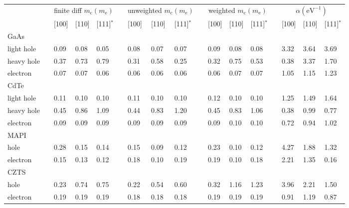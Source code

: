 \begin{landscape}
\newcommand{\ra}[1]{\renewcommand{\arraystretch}{#1}}
\begin{table}[tb]\centering
\ra{1.3}
\begin{tabular}{@{}lclllclllclllclll@{}}\toprule
& \phantom{abc}&\multicolumn{3}{c}{finite diff $m_\text{c}\left(m_{\text{e}}\right)$} & \phantom{abc}& \multicolumn{3}{c}{unweighted $m_\text{c}\left(m_{\text{e}}\right)$} &\phantom{abc} & \multicolumn{3}{c}{weighted $m_\text{c}\left(m_{\text{e}}\right)$} & \phantom{abc} & \multicolumn{3}{c}{$\alpha \left(\mathrm{eV}^{-1}\right)$}\\
\cline{3-5} \cline{7-9} \cline{11-13} \cline{15-17}
&& [100] & [110] & [111]$^*$  && [100] & [110] & [111]$^*$   && [100] & [110] & [111]$^*$   && [100] & [110] & [111]$^*$  \\ 
\midrule
GaAs\\
light hole 
&& 0.09 & 0.08 & 0.05        &&  0.08    & 0.07  & 0.07     && 0.09 & 0.08 & 0.08     && 3.32 & 3.64 & 3.69  \\
heavy hole 
&& 0.37 & 0.73 & 0.79        &&  0.31    & 0.58  & 0.25     && 0.32 & 0.75 & 0.53     && 0.38 & 3.37 & 1.70  \\
electron 
&& 0.07 & 0.07 & 0.06        &&  0.06    & 0.06  & 0.06     && 0.06 & 0.07 & 0.07     && 1.05 & 1.15 & 1.23  \\
CdTe\\
light hole 
&& 0.11 & 0.10 & 0.10        &&  0.11    & 0.10  & 0.10     && 0.12 & 0.10 & 0.10     && 1.25 & 1.49 & 1.64  \\
heavy hole 
&& 0.45 & 0.86 & 1.09        &&  0.44    & 0.83  & 1.20     && 0.45 & 0.83 & 1.06     && 0.38 & 0.99 & 0.77  \\
electron 
&& 0.09 & 0.09 & 0.09        &&  0.09    & 0.09  & 0.09     && 0.09 & 0.10 & 0.10     && 0.72 & 0.94 & 1.02  \\
MAPI\\
hole 
&& 0.28 & 0.15 & 0.14        &&  0.15    & 0.09  & 0.12     && 0.23 & 0.10 & 0.12     && 4.27 & 1.88 & 1.32  \\
electron 
&& 0.15 & 0.13 & 0.12        &&  0.18    & 0.10  & 0.19     && 0.19 & 0.10 & 0.18     && 2.21 & 1.35 & 0.16  \\
CZTS\\
hole 
&& 0.23 & 0.74 & 0.75        &&  0.22    & 0.54  & 0.60     && 0.32 & 1.16 & 1.23     && 3.96 & 2.21 & 1.50  \\
electron 
&& 0.19 & 0.19 & 0.19        &&  0.18    & 0.18  & 0.18     && 0.19 & 0.19 & 0.19     && 0.91 & 1.19 & 0.87  \\

\end{tabular}
\end{table}
\end{landscape}

